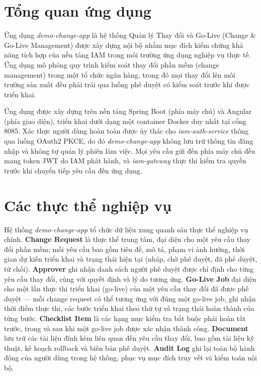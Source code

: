 \documentclass[../DoAn.tex]{subfiles}
\begin{document}
\label{appendix:change-app}

\section{Tổng quan ứng dụng}

Ứng dụng \textit{demo-change-app} là hệ thống Quản lý Thay đổi và Go-Live (Change \& Go-Live Management) được xây dựng nội bộ nhằm mục đích kiểm chứng khả năng tích hợp của nền tảng IAM trong môi trường ứng dụng nghiệp vụ thực tế. Ứng dụng mô phỏng quy trình kiểm soát thay đổi phần mềm (change management) trong một tổ chức ngân hàng, trong đó mọi thay đổi lên môi trường sản xuất đều phải trải qua luồng phê duyệt có kiểm soát trước khi được triển khai.

Ứng dụng được xây dựng trên nền tảng Spring Boot (phía máy chủ) và Angular (phía giao diện), triển khai dưới dạng một container Docker duy nhất tại cổng 8085. Xác thực người dùng hoàn toàn được ủy thác cho \textit{iam-auth-service} thông qua luồng OAuth2 PKCE, do đó \textit{demo-change-app} không lưu trữ thông tin đăng nhập và không tự quản lý phiên làm việc. Mọi yêu cầu gửi đến phía máy chủ đều mang token JWT do IAM phát hành, và \textit{iam-gateway} thực thi kiểm tra quyền trước khi chuyển tiếp yêu cầu đến ứng dụng.

\section{Các thực thể nghiệp vụ}

Hệ thống \textit{demo-change-app} tổ chức dữ liệu xung quanh sáu thực thể nghiệp vụ chính. \textbf{Change Request} là thực thể trung tâm, đại diện cho một yêu cầu thay đổi phần mềm; mỗi yêu cầu bao gồm tiêu đề, mô tả, phạm vi ảnh hưởng, thời gian dự kiến triển khai và trạng thái hiện tại (nháp, chờ phê duyệt, đã phê duyệt, từ chối). \textbf{Approver} ghi nhận danh sách người phê duyệt được chỉ định cho từng yêu cầu thay đổi, cùng với quyết định và lý do tương ứng. \textbf{Go-Live Job} đại diện cho một lần thực thi triển khai (go-live) của một yêu cầu thay đổi đã được phê duyệt --- mỗi change request có thể tương ứng với đúng một go-live job, ghi nhận thời điểm thực thi, các bước triển khai theo thứ tự và trạng thái hoàn thành của từng bước. \textbf{Checklist Item} là các hạng mục kiểm tra bắt buộc phải hoàn tất trước, trong và sau khi một go-live job được xác nhận thành công. \textbf{Document} lưu trữ các tài liệu đính kèm liên quan đến yêu cầu thay đổi, bao gồm tài liệu kỹ thuật, kế hoạch rollback và biên bản phê duyệt. \textbf{Audit Log} ghi lại toàn bộ hành động của người dùng trong hệ thống, phục vụ mục đích truy vết và kiểm toán nội bộ.
\end{document}
